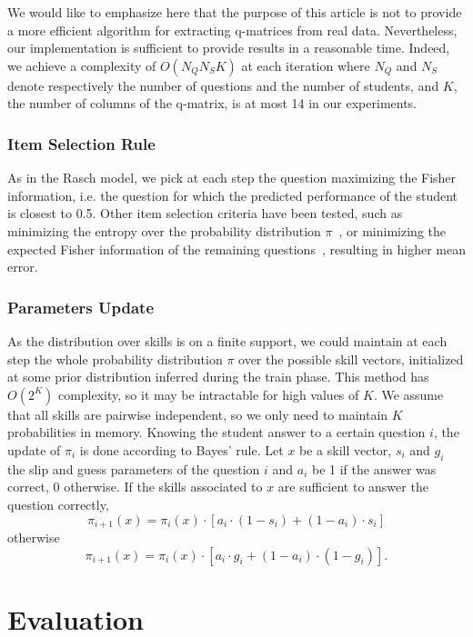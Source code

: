 \documentclass{edm_template}
\begin{document}
We would like to emphasize here that the purpose of this article is not to provide a more efficient algorithm for extracting q-matrices from real data. Nevertheless, our implementation is sufficient to provide results in a reasonable time. Indeed, we achieve a complexity of $O(N_Q N_S K)$ at each iteration where $N_Q$ and $N_S$ denote respectively the number of questions and the number of students, and $K$, the number of columns of the q-matrix, is at most 14 in our experiments.

\subsubsection{Item Selection Rule}

As in the Rasch model, we pick at each step the question maximizing the Fisher information, i.e. the question for which the predicted performance of the student is closest to 0.5. Other item selection criteria have been tested, such as minimizing the entropy over the probability distribution $\pi$~\cite{Huebner2010}, or minimizing the expected Fisher information of the remaining questions~\cite{MagisRaiche2012}, resulting in higher mean error.

\subsubsection{Parameters Update}

As the distribution over skills is on a finite support, we could maintain at each step the whole probability distribution $\pi$ over the possible skill vectors, initialized at some prior distribution inferred during the train phase. This method has $O(2^K)$ complexity, so it may be intractable for high values of $K$. We assume that all skills are pairwise independent, so we only need to maintain $K$ probabilities in memory.
Knowing the student answer to a certain question $i$, the update of $\pi_i$ is done according to Bayes' rule. Let $x$ be a skill vector, $s_i$ and $g_i$ the slip and guess parameters of the question $i$ and $a_i$ be 1 if the answer was correct, 0 otherwise. If the skills associated to $x$ are sufficient to answer the question correctly,
\[ \pi_{i+1}(x) = \pi_i(x) \cdot [a_i \cdot(1-s_i) + (1-a_i)\cdot s_i] \]
otherwise
\[ \pi_{i+1}(x) = \pi_i(x) \cdot [a_i \cdot g_i + (1-a_i)\cdot(1-g_i)]. \]

\section{Evaluation}
\end{document}

